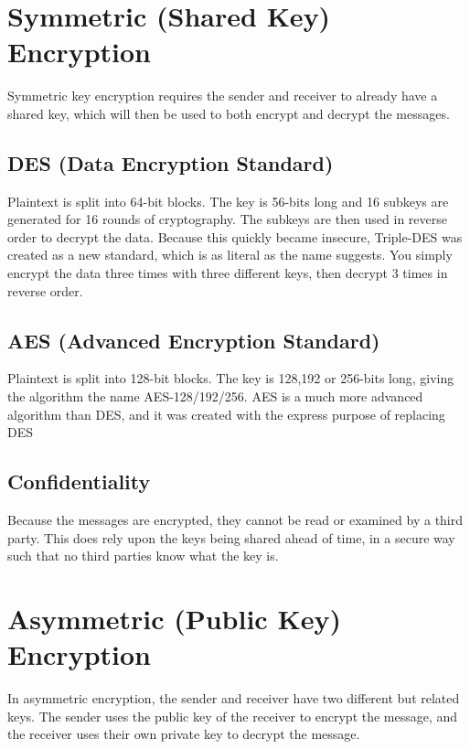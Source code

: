 \section*{Symmetric (Shared Key) Encryption}

Symmetric key encryption requires the sender and receiver to already have a shared key, which will then be used to both
 encrypt and decrypt the messages.

\subsection*{DES (Data Encryption Standard)}

Plaintext is split into 64-bit blocks. The key is 56-bits long and 16 subkeys are generated for 16 rounds of cryptography.
 The subkeys are then used in reverse order to decrypt the data. Because this quickly became insecure, Triple-DES was
 created as a new standard, which is as literal as the name suggests. You simply encrypt the data three times with
 three different keys, then decrypt 3 times in reverse order.

\subsection*{AES (Advanced Encryption Standard)}

Plaintext is split into 128-bit blocks. The key is 128,192 or 256-bits long, giving the algorithm the name AES-128/192/256.
 AES is a much more advanced algorithm than DES, and it was created with the express purpose of replacing DES

\subsection*{Confidentiality}

Because the messages are encrypted, they cannot be read or examined by a third party. This does rely upon the keys being
 shared ahead of time, in a secure way such that no third parties know what the key is.

\section*{Asymmetric (Public Key) Encryption}

In asymmetric encryption, the sender and receiver have two different but related keys. The sender uses the public key of
 the receiver to encrypt the message, and the receiver uses their own private key to decrypt the message.

